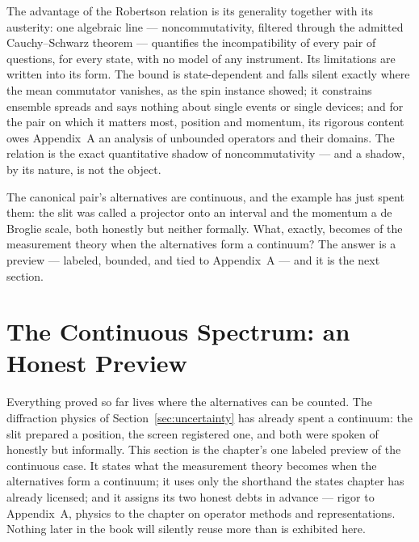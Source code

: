 The advantage of the Robertson relation is its generality together with its austerity: one algebraic line --- noncommutativity, filtered through the admitted Cauchy--Schwarz theorem --- quantifies the incompatibility of every pair of questions, for every state, with no model of any instrument. Its limitations are written into its form. The bound is state-dependent and falls silent exactly where the mean commutator vanishes, as the spin instance showed; it constrains ensemble spreads and says nothing about single events or single devices; and for the pair on which it matters most, position and momentum, its rigorous content owes Appendix~A an analysis of unbounded operators and their domains. The relation is the exact quantitative shadow of noncommutativity --- and a shadow, by its nature, is not the object.

The canonical pair's alternatives are continuous, and the example has just spent them: the slit was called a projector onto an interval and the momentum a de Broglie scale, both honestly but neither formally. What, exactly, becomes of the measurement theory when the alternatives form a continuum? The answer is a preview --- labeled, bounded, and tied to Appendix~A --- and it is the next section.

\section{The Continuous Spectrum: an Honest Preview}
\label{sec:continuous-spectra}

Everything proved so far lives where the alternatives can be counted. The diffraction physics of Section~\ref{sec:uncertainty} has already spent a continuum: the slit prepared a position, the screen registered one, and both were spoken of honestly but informally. This section is the chapter's one labeled preview of the continuous case. It states what the measurement theory becomes when the alternatives form a continuum; it uses only the shorthand the states chapter has already licensed; and it assigns its two honest debts in advance --- rigor to Appendix~A, physics to the chapter on operator methods and representations. Nothing later in the book will silently reuse more than is exhibited here.

